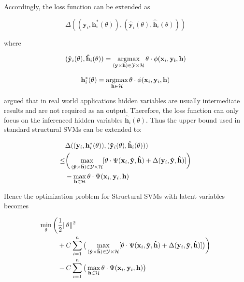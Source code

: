 \documentclass[sigconf, anonymous, review]{acmart}
\renewcommand{\citename}{\citet}
\renewcommand{\cite}{\citep}
\begin{document}
Accordingly, the loss function can be extended as

$$
\Delta((\mathbf{y}_i,\mathbf{h}^*_i(\theta)),(\mathbf{\hat{y}}_i(\theta),\mathbf{\hat{h}}_i(\theta)))
$$

\noindent where

\begin{align}
  \label{eq:latentssvm_full_inf}
 (\mathbf{\hat{y}}_i(\theta),\mathbf{\hat{h}}_i(\theta))=\mathop{\textrm{argmax}}_{(\mathbf{y}
  \times \mathbf{h}) \in \mathcal{Y} \times \mathcal{H}}
\theta\cdot\phi(\mathbf{x}_i,\mathbf{y_i},\mathbf{h})
\end{align}

\begin{align}
  \label{eq:latentssvm_latent_inf}
  \mathbf{h}^*_i(\theta) = \mathop{\textrm{argmax}}_{\mathbf{h} \in \mathcal{H}} \theta \cdot
  \phi(\mathbf{x}_i,\mathbf{y}_i,\mathbf{h})
\end{align}

\citename{yu2009learning} argued that in real world applications
hidden variables are usually intermediate results and are not
required as an output\cite{yu2009learning}. Therefore, the loss
function can only focus on the inferenced hidden variables
$\mathbf{\hat{h}}_i(\theta)$. Thus the upper bound used in
standard structural SVMs\cite{tsochantaridis2005large} can be
extended to:

\begin{align}
  &\Delta((\mathbf{y}_i,\mathbf{h}^*_i(\theta)),(\mathbf{\hat{y}}_i(\theta),\mathbf{\hat{h}}_i(\theta)))\notag\\
  \leq&
    \bigg(\max_{(\mathbf{\hat{y}} \times \mathbf{\hat{h}}) \in
    \mathcal{Y} \times \mathcal{H}}
    [\theta\cdot\Psi(\mathbf{x}_i,\mathbf{\hat{y}},\mathbf{\hat{h}})
  +\Delta(\mathbf{y}_i,\mathbf{\hat{y}},\mathbf{\hat{h}})]\bigg)\notag\\
  &-\max_{\mathbf{h} \in \mathcal{H}} \theta \cdot
    \Psi(\mathbf{x}_i,\mathbf{y}_i,\mathbf{h})
\end{align}

Hence the optimization problem for Structural SVMs with latent
variables becomes

\begin{align}
\label{eq:latent_ssvm_object}
  \min_\theta\bigg(&\frac{1}{2}\|\theta\|^2 \notag \\
  & + C\sum_{i=1}^{n}\big(\max_{(\mathbf{\hat{y}} \times
  \mathbf{\hat{h}}) \in \mathcal{Y} \times \mathcal{H}}
  [\theta\cdot\Psi(\mathbf{x}_i,\mathbf{\hat{y}},\mathbf{\hat{h}}) +
  \Delta(\mathbf{y}_i,\mathbf{\hat{y}},\mathbf{\hat{h}})]\big)\bigg)\notag \\
  & -C\sum_{i=1}^{n}\big(\max_{\mathbf{h} \in \mathcal{H}} \theta \cdot
  \Psi(\mathbf{x}_i,\mathbf{y}_i,\mathbf{h})\big)
\end{align}
\end{document}

